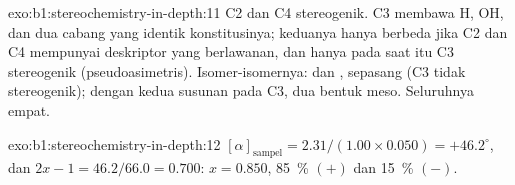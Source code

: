 \begin{solution}{exo:b1:stereochemistry-in-depth:11}
C2 dan C4 stereogenik. C3 membawa H, OH, dan dua cabang yang identik
konstitusinya; keduanya hanya berbeda jika C2 dan C4 mempunyai
deskriptor yang berlawanan, dan hanya pada saat itu C3 stereogenik
(pseudoasimetris). Isomer-isomernya:  dan ,
sepasang  (C3 tidak stereogenik);  dengan kedua
susunan pada C3, dua bentuk meso. Seluruhnya empat.
\end{solution}

\begin{solution}{exo:b1:stereochemistry-in-depth:12}
$[\alpha]_{\text{sampel}} = 2.31/(1.00 \times 0.050) = +46.2^\circ$, dan
$2x - 1 = 46.2/66.0 = 0.700$: $x = 0.850$, \qty{85}{\percent} 
$(+)$ dan \qty{15}{\percent}  $(-)$.
\end{solution}

